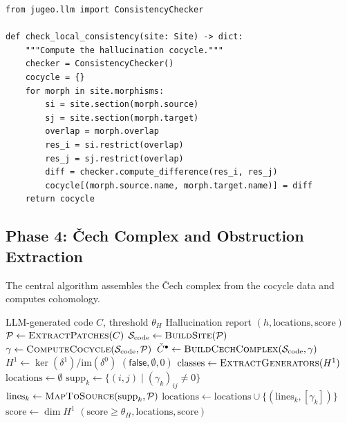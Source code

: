\documentclass[11pt]{article}
\newcommand{\HalluDetect}{\textsc{HalluDetect}}
\newcommand{\CodeSite}{\Site_{\mathrm{code}}}
\newcommand{\SemPatch}{\mathcal{P}}
\newcommand{\HalluThresh}{\theta_H}
\begin{document}
\begin{lstlisting}
from jugeo.llm import ConsistencyChecker

def check_local_consistency(site: Site) -> dict:
    """Compute the hallucination cocycle."""
    checker = ConsistencyChecker()
    cocycle = {}
    for morph in site.morphisms:
        si = site.section(morph.source)
        sj = site.section(morph.target)
        overlap = morph.overlap
        res_i = si.restrict(overlap)
        res_j = sj.restrict(overlap)
        diff = checker.compute_difference(res_i, res_j)
        cocycle[(morph.source.name, morph.target.name)] = diff
    return cocycle
\end{lstlisting}


\subsection{Phase 4: \v{C}ech Complex and Obstruction Extraction}

The central algorithm assembles the \v{C}ech complex from the cocycle
data and computes cohomology.

\begin{algorithm}[t]
\caption{\HalluDetect: Obstruction-Based Hallucination Detection}\label{alg:hallu-detect}
\begin{algorithmic}[1]
\REQUIRE LLM-generated code $C$, threshold $\HalluThresh$
\ENSURE Hallucination report $(h, \mathrm{locations}, \mathrm{score})$
\STATE $\SemPatch \leftarrow \textsc{ExtractPatches}(C)$
\STATE $\CodeSite \leftarrow \textsc{BuildSite}(\SemPatch)$
\STATE $\gamma \leftarrow \textsc{ComputeCocycle}(\CodeSite, \SemPatch)$
\STATE $\Cech^\bullet \leftarrow \textsc{BuildCechComplex}(\CodeSite, \gamma)$
\STATE $H^1 \leftarrow \ker(\delta^1) / \mathrm{im}(\delta^0)$
  \RETURN $(\mathsf{false}, \emptyset, 0)$
\ENDIF
\STATE $\mathrm{classes} \leftarrow \textsc{ExtractGenerators}(H^1)$
\STATE $\mathrm{locations} \leftarrow \emptyset$
  \STATE $\mathrm{supp}_k \leftarrow \{(i,j) \mid (\gamma_k)_{ij} \neq 0\}$
  \STATE $\mathrm{lines}_k \leftarrow \textsc{MapToSource}(\mathrm{supp}_k, \SemPatch)$
  \STATE $\mathrm{locations} \leftarrow \mathrm{locations} \cup \{(\mathrm{lines}_k, [\gamma_k])\}$
\ENDFOR
\STATE $\mathrm{score} \leftarrow \dim H^1$
\RETURN $(\mathrm{score} \geq \HalluThresh, \mathrm{locations}, \mathrm{score})$
\end{algorithmic}
\end{algorithm}
\end{document}
